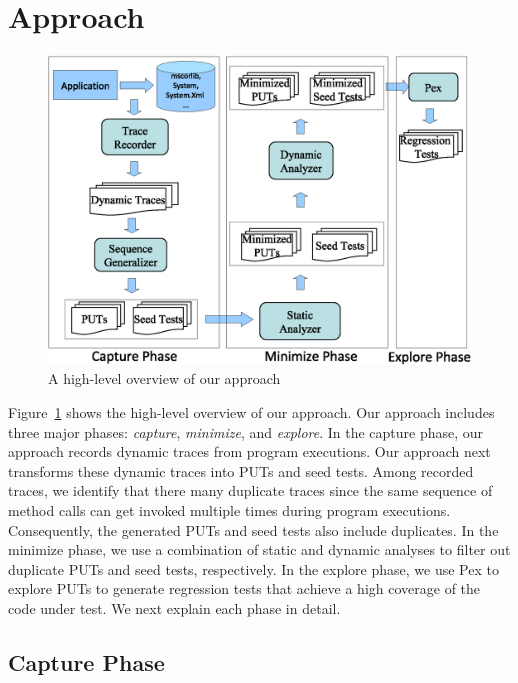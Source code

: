 \section{Approach}
\label{sec:approach}

\begin{figure}[t]
\centering
\includegraphics[scale=0.66,clip]{figs/approach1.eps}\vspace*{-1ex}
\caption{A high-level overview of our approach} \label{fig:overview}
\end{figure}

Figure~\ref{fig:overview} shows the high-level overview of our approach. Our approach
includes three major phases: \emph{capture}, \emph{minimize}, and \emph{explore}. In the
capture phase, our approach records dynamic traces from program executions.
Our approach next transforms these dynamic traces into
PUTs and seed tests. Among recorded traces, we identify that there 
many duplicate traces since the same sequence of method calls can 
get invoked multiple times during program executions. Consequently,
the generated PUTs and seed tests also include duplicates.
In the minimize phase, we use a combination of static and dynamic
analyses to filter out duplicate PUTs and seed tests, respectively.
In the explore phase, we use Pex to explore
PUTs to generate regression tests that achieve a high coverage
of the code under test. We next explain each phase in detail.

\subsection{Capture Phase}
\label{sec:capture}

